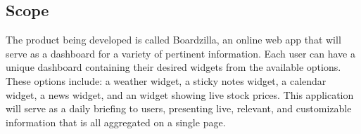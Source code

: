 \documentclass[]{article}
\begin{document}

\subsection{Scope}
\label{sub:scope}
The product being developed is called Boardzilla, an online web app that will serve as a dashboard for a variety of pertinent information. Each user can have a unique dashboard containing their desired widgets from the available options. These options include: a weather widget, a sticky notes widget, a calendar widget, a news widget, and an widget showing live stock prices. This application will serve as a daily briefing to users, presenting live, relevant, and customizable information that is all aggregated on a single page. 

\end{document}
